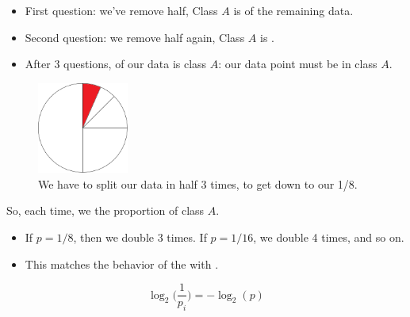         \begin{itemize}
            \item First question: we've remove half, Class $A$ is  of the remaining data.
            \item Second question: we remove half again, Class $A$ is .
            \item After 3 questions,  of our data is class $A$: our data point must be in class $A$.
        \end{itemize}

        \begin{figure}[H]
            \centering
            \includegraphics[width=30mm,scale=0.5]{images/nonparametric_images/dataset_split.png}
            \caption*{We have to split our data in half 3 times, to get down to our 1/8.}
        \end{figure}

        So, each time, we  the proportion of class $A$. 

        \begin{itemize}
            \item If $p=1/8$, then we double 3 times. If $p=1/16$, we double 4 times, and so on.

            \item This matches the behavior of the  with .
        \end{itemize}

        \begin{equation}
            \log_2 \Bigg( \frac{1}{p_i} \Bigg) = - \log_2 (p)
        \end{equation}

